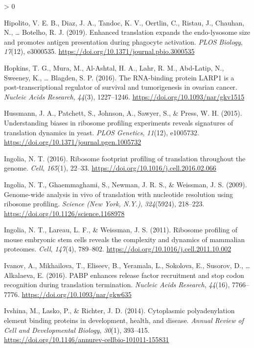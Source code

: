 \documentclass[
  12pt,
  openany]{book}
\newlength{\cslhangindent}
\newenvironment{CSLReferences}[2] %
 {%
  \setlength{\parindent}{0pt}
  \ifodd #1 \everypar{\setlength{\hangindent}{\cslhangindent}}\ignorespaces\fi
  \ifnum #2 > 0
  \setlength{\parskip}{#2\baselineskip}
  \fi
 }%
 {}
\begin{document}
\begin{CSLReferences}{1}{0}
\leavevmode\hypertarget{ref-Hipolito2019}{}%
Hipolito, V. E. B., Diaz, J. A., Tandoc, K. V., Oertlin, C., Ristau, J., Chauhan, N., \ldots{} Botelho, R. J. (2019). Enhanced translation expands the endo-lysosome size and promotes antigen presentation during phagocyte activation. \emph{{PLOS} Biology}, \emph{17}(12), e3000535. \url{https://doi.org/10.1371/journal.pbio.3000535}

\leavevmode\hypertarget{ref-Hopkins2016}{}%
Hopkins, T. G., Mura, M., Al-Ashtal, H. A., Lahr, R. M., Abd-Latip, N., Sweeney, K., \ldots{} Blagden, S. P. (2016). The {RNA}-binding protein {LARP}1 is a post-transcriptional regulator of survival and tumorigenesis in ovarian cancer. \emph{Nucleic Acids Research}, \emph{44}(3), 1227--1246. \url{https://doi.org/10.1093/nar/gkv1515}

\leavevmode\hypertarget{ref-Hussmann2015}{}%
Hussmann, J. A., Patchett, S., Johnson, A., Sawyer, S., \& Press, W. H. (2015). Understanding biases in ribosome profiling experiments reveals signatures of translation dynamics in yeast. \emph{{PLOS} Genetics}, \emph{11}(12), e1005732. \url{https://doi.org/10.1371/journal.pgen.1005732}

\leavevmode\hypertarget{ref-Ingolia2016}{}%
Ingolia, N. T. (2016). Ribosome footprint profiling of translation throughout the genome. \emph{Cell}, \emph{165}(1), 22--33. \url{https://doi.org/10.1016/j.cell.2016.02.066}

\leavevmode\hypertarget{ref-Ingolia2009}{}%
Ingolia, N. T., Ghaemmaghami, S., Newman, J. R. S., \& Weissman, J. S. (2009). Genome-wide analysis in vivo of translation with nucleotide resolution using ribosome profiling. \emph{Science (New York, N.Y.)}, \emph{324}(5924), 218--223. \url{https://doi.org/10.1126/science.1168978}

\leavevmode\hypertarget{ref-Ingolia2011}{}%
Ingolia, N. T., Lareau, L. F., \& Weissman, J. S. (2011). Ribosome profiling of mouse embryonic stem cells reveals the complexity and dynamics of mammalian proteomes. \emph{Cell}, \emph{147}(4), 789--802. \url{https://doi.org/10.1016/j.cell.2011.10.002}

\leavevmode\hypertarget{ref-Ivanov2016}{}%
Ivanov, A., Mikhailova, T., Eliseev, B., Yeramala, L., Sokolova, E., Susorov, D., \ldots{} Alkalaeva, E. (2016). {PABP} enhances release factor recruitment and stop codon recognition during translation termination. \emph{Nucleic Acids Research}, \emph{44}(16), 7766--7776. \url{https://doi.org/10.1093/nar/gkw635}

\leavevmode\hypertarget{ref-Ivshina2014}{}%
Ivshina, M., Lasko, P., \& Richter, J. D. (2014). Cytoplasmic polyadenylation element binding proteins in development, health, and disease. \emph{Annual Review of Cell and Developmental Biology}, \emph{30}(1), 393--415. \url{https://doi.org/10.1146/annurev-cellbio-101011-155831}


\end{CSLReferences}
\end{document}
